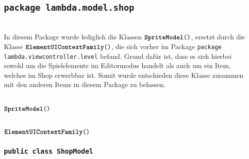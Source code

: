 \subsection{\texttt{package lambda.model.shop}}
\item[Allgemein] \hfill \\ In diesem Package wurde lediglich die Klassen $\texttt{\textbf{SpriteModel}()}$, ersetzt durch die Klasse $\texttt{\textbf{ElementUIContextFamily}()}$, die sich vorher im Package \texttt{package lambda.viewcontroller.level} befand. Grund dafür ist, dass es sich hierbei sowohl um die Spielelemente im Editormodus handelt als auch um ein Item, welches im Shop erwerbbar ist. Somit wurde entschieden diese Klasse zusammen mit den anderen Items in diesem Package zu belassen.


\item[Entfernte Klassen] \hfill \\ $\texttt{\textbf{SpriteModel}()}$
\item[Hinzugefügte Klassen] \hfill \\ $\texttt{\textbf{ElementUIContextFamily}()}$

\subsubsection{\normalfont \texttt{public class \textbf{ShopModel}}}

